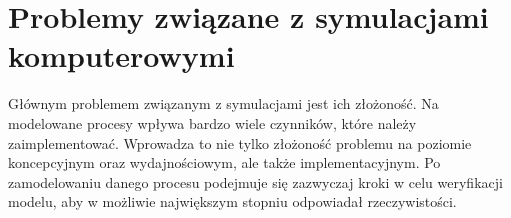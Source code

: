 \section{Problemy związane z symulacjami komputerowymi}
\label{sec:ProblemyzSymulacjami}

Głównym problemem związanym z symulacjami jest ich złożoność. Na modelowane procesy wpływa bardzo wiele czynników, które należy zaimplementować. Wprowadza to nie tylko złożoność problemu na poziomie koncepcyjnym oraz wydajnościowym, ale także implementacyjnym. Po zamodelowaniu danego procesu podejmuje się zazwyczaj kroki w celu weryfikacji modelu, aby w możliwie największym stopniu odpowiadał rzeczywistości.

















